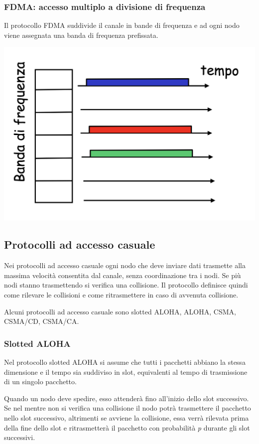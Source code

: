 \documentclass{report}
\begin{document}
\hypertarget{header-n61}{%
\subsubsection{FDMA: accesso multiplo a divisione di
frequenza}\label{header-n61}}

Il protocollo FDMA suddivide il canale in bande di frequenza e ad ogni
nodo viene assegnata una banda di frequenza prefissata.

\begin{center}
		\includegraphics[width=0.7\linewidth]{fdma}
	\end{center}

\hypertarget{header-n64}{%
\subsection{Protocolli ad accesso casuale}\label{header-n64}}

Nei protocolli ad accesso casuale ogni nodo che deve inviare dati
trasmette alla massima velocità consentita dal canale, senza
coordinazione tra i nodi. Se più nodi stanno trasmettendo si verifica
una collisione. Il protocollo definisce quindi come rilevare le
collisioni e come ritrasmettere in caso di avvenuta collisione.

Alcuni protocolli ad accesso casuale sono slotted ALOHA, ALOHA, CSMA,
CSMA/CD, CSMA/CA.

\hypertarget{header-n67}{%
\subsubsection{Slotted ALOHA}\label{header-n67}}

Nel protocollo slotted ALOHA si assume che tutti i pacchetti abbiano la
stessa dimensione e il tempo sia suddiviso in slot, equivalenti al tempo
di trasmissione di un singolo pacchetto.

Quando un nodo deve spedire, esso attenderà fino all'inizio dello slot
successivo. Se nel mentre non si verifica una collisione il nodo potrà
trasmettere il pacchetto nello slot successivo, altrimenti se avviene la
collisione, essa verrà rilevata prima della fine dello slot e
ritrasmetterà il pacchetto con probabilità \emph{p} durante gli slot
successivi.
\end{document}
